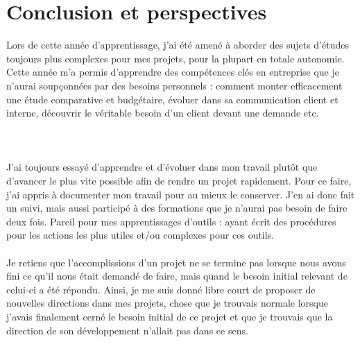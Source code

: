 \section{Conclusion et perspectives}
\label{conclusion}

Lors de cette année d'apprentissage, j'ai été amené à aborder des sujets d'études toujours plus complexes pour mes projets, pour la plupart en totale autonomie. Cette année m'a permis d'apprendre des compétences clés en entreprise que je n'aurai soupçonnées par des besoins personnels : comment monter efficacement une étude comparative et budgétaire, évoluer dans sa communication client et interne, découvrir le véritable besoin d'un client devant une demande etc.
\\ \\
\\ \\
J'ai toujours essayé d'apprendre et d'évoluer dans mon travail plutôt que d'avancer le plus vite possible afin de rendre un projet rapidement. Pour ce faire, j'ai appris à documenter mon travail pour au mieux le conserver. J'en ai donc fait un suivi, mais aussi participé à des formations que je n'aurai pas besoin de faire deux fois. Pareil pour mes apprentissages d'outils : ayant écrit des procédures pour les actions les plus utiles et/ou complexes pour ces outils.
\\ \\
Je retiens que l'accomplissions d'un projet ne se termine pas lorsque nous avons fini ce qu'il nous était demandé de faire, mais quand le besoin initial relevant de celui-ci a été répondu. Ainsi, je me suis donné libre court de proposer de nouvelles directions dans mes projets, chose que je trouvais normale lorsque j'avais finalement cerné le besoin initial de ce projet et que je trouvais que la direction de son développement n'allait pas dans ce sens.
